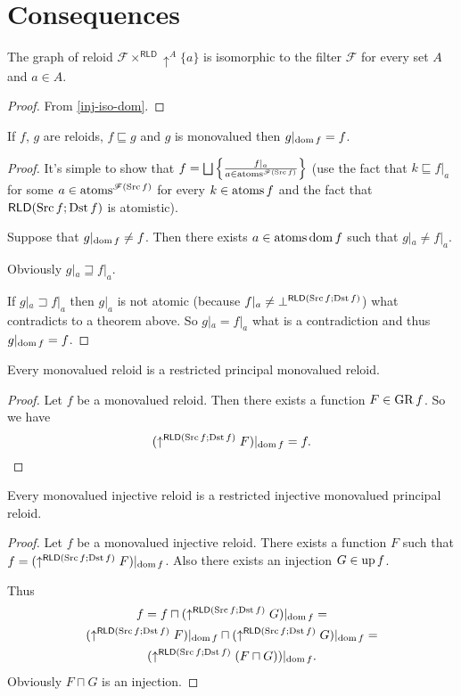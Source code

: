 \section{Consequences}
\begin{thm}
\label{triv-atom-prod}The graph of reloid $\mathcal{F}\times^{\mathsf{RLD}}\uparrow^{A}\{a\}$
is isomorphic to the filter $\mathcal{F}$ for every set $A$ and
$a\in A$.\end{thm}
\begin{proof}
From \ref{inj-iso-dom}.\end{proof}
\begin{thm}
If $f$, $g$ are reloids, $f\sqsubseteq g$ and $g$ is monovalued
then $g|_{\operatorname{dom} f}=f$.\end{thm}
\begin{proof}
It's simple to show that $f=\bigsqcup\left\{ \frac{f|_{a}}{a\in\operatorname{atoms}^{\mathscr{F}(\operatorname{Src} f)}}\right\}$
(use the fact that $k\sqsubseteq f|_{a}$ for some $a\in\operatorname{atoms}^{\mathscr{F}(\operatorname{Src} f)}$
for every $k\in\operatorname{atoms} f$ and the fact that $\mathsf{RLD}(\operatorname{Src} f;\operatorname{Dst} f)$
is atomistic).

Suppose that $g|_{\operatorname{dom} f}\neq f$. Then there exists $a\in\operatorname{atoms}\operatorname{dom} f$
such that $g|_{a}\neq f|_{a}$.

Obviously $g|_{a}\sqsupseteq f|_{a}$.

If $g|_{a}\sqsupset f|_{a}$ then $g|_{a}$ is not atomic (because
$f|_{a}\ne\bot^{\mathsf{RLD}(\operatorname{Src} f;\operatorname{Dst} f)}$) what contradicts to
a theorem above. So $g|_{a}=f|_{a}$ what is a contradiction and thus
$g|_{\operatorname{dom} f}=f$.\end{proof}
\begin{cor}
\label{mv-is-restr}Every monovalued reloid is a restricted principal
monovalued reloid.\end{cor}
\begin{proof}
Let $f$ be a monovalued reloid. Then there exists a function $F\in\operatorname{GR} f$.
So we have
\[
(\uparrow^{\mathsf{RLD}(\operatorname{Src} f;\operatorname{Dst} f)}F)|_{\operatorname{dom} f}=f.
\]
\end{proof}
\begin{cor}
Every monovalued injective reloid is a restricted injective monovalued
principal reloid.\end{cor}
\begin{proof}
Let $f$ be a monovalued injective reloid. There exists a function
$F$ such that $f=(\uparrow^{\mathsf{RLD}(\operatorname{Src} f;\operatorname{Dst} f)}F)|_{\operatorname{dom} f}$.
Also there exists an injection $G\in\operatorname{up} f$.

Thus
\begin{multline*}
f=f\sqcap(\uparrow^{\mathsf{RLD}(\operatorname{Src} f;\operatorname{Dst} f)}G)|_{\operatorname{dom} f}=\\
(\uparrow^{\mathsf{RLD}(\operatorname{Src} f;\operatorname{Dst} f)}F)|_{\operatorname{dom} f}\sqcap(\uparrow^{\mathsf{RLD}(\operatorname{Src} f;\operatorname{Dst} f)}G)|_{\operatorname{dom} f}=\\
(\uparrow^{\mathsf{RLD}(\operatorname{Src} f;\operatorname{Dst} f)}(F\sqcap G))|_{\operatorname{dom} f}.
\end{multline*}
Obviously $F\sqcap G$ is an injection.\end{proof}
